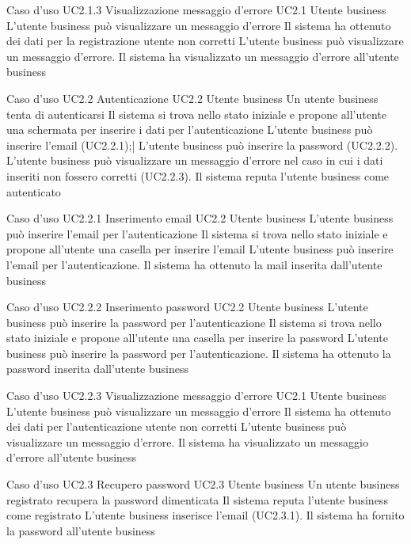 \UCtitle
{Caso d'uso UC2.1.3}
{Visualizzazione messaggio d'errore}
\UC
{UC2.1}
{Utente business}
{L'utente business può visualizzare un messaggio d'errore}
{Il sistema ha ottenuto dei dati per la registrazione utente non corretti}
\scenario
{L'utente business può visualizzare un messaggio d'errore.}
\post
{Il sistema ha visualizzato un messaggio d'errore all'utente business}

\UCtitle
{Caso d'uso UC2.2}
{Autenticazione}
\UC
{UC2.2}
{Utente business}
{Un utente business tenta di autenticarsi}
{Il sistema si trova nello stato iniziale e propone all'utente una schermata per inserire i dati per l'autenticazione}
\scenario
{
L'utente business può inserire l'email (UC2.2.1);|
L'utente business può inserire la password (UC2.2.2).
}
\scenarioAlt
{
L'utente business può visualizzare un messaggio d'errore nel caso in cui i dati inseriti non fossero corretti (UC2.2.3).
}
\post
{Il sistema reputa l'utente business come autenticato}

\UCtitle
{Caso d'uso UC2.2.1}
{Inserimento email}
\UC
{UC2.2}
{Utente business}
{L'utente business può inserire l'email per l'autenticazione}
{Il sistema si trova nello stato iniziale e propone all'utente una casella per inserire l'email}
\scenario
{L'utente business può inserire l'email per l'autenticazione.}
\post
{Il sistema ha ottenuto la mail inserita dall'utente business}

\UCtitle
{Caso d'uso UC2.2.2}
{Inserimento password}
\UC
{UC2.2}
{Utente business}
{L'utente business può inserire la password per l'autenticazione}
{Il sistema si trova nello stato iniziale e propone all'utente una casella per inserire la password}
\scenario
{L'utente business può inserire la password per l'autenticazione.}
\post
{Il sistema ha ottenuto la password inserita dall'utente business}

\UCtitle
{Caso d'uso UC2.2.3}
{Visualizzazione messaggio d'errore}
\UC
{UC2.1}
{Utente business}
{L'utente business può visualizzare un messaggio d'errore}
{Il sistema ha ottenuto dei dati per l'autenticazione utente non corretti}
\scenario
{L'utente business può visualizzare un messaggio d'errore.}
\post
{Il sistema ha visualizzato un messaggio d'errore all'utente business}

\UCtitle
{Caso d'uso UC2.3}
{Recupero password}
\UC
{UC2.3}
{Utente business}
{Un utente business registrato recupera la password dimenticata}
{Il sistema  reputa l'utente business come registrato}
\scenario
{L'utente business inserisce l'email (UC2.3.1).
}
\post
{Il sistema ha fornito la password all'utente business}

